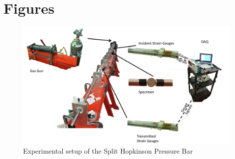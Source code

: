 \documentclass[12pt]{article}
\begin{document}
\section{Figures}
\begin{figure}[H]
	\centering
	\includegraphics[width=1\textwidth]{TestSetUp.png}
	\caption{Experimental setup of the Split Hopkinson Pressure Bar}
	\label{fig:TestSetup}
\end{figure}
\end{document}
